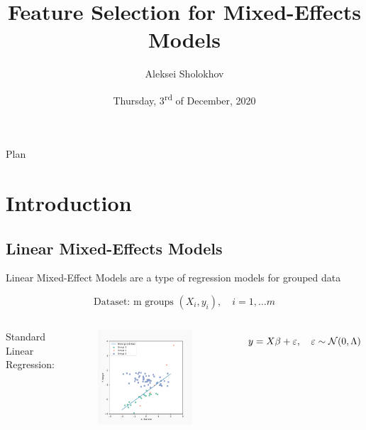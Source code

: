 \documentclass[8pt]{beamer}
\title{Feature Selection for Mixed-Effects Models}
\date{Thursday, 3\textsuperscript{rd} of December, 2020}
\author{Aleksei Sholokhov}
\begin{document}
\maketitle

\begin{frame}{Plan}
	\tableofcontents
\end{frame}

\section{Introduction}
\subsection{Linear Mixed-Effects Models}
\begin{frame}{Linear Mixed-Effect Models are a type of regression models for grouped data}

	\[
	\text{Dataset: m groups } (X_i, y_i),\quad i = 1, \dots m
    \]
	\begin{columns}[T,onlytextwidth]
	 \centering Standard Linear Regression:
   	\begin{figure}
   		\includegraphics[width=0.9\textwidth]{Figures/lme_example_mean_prediction}
   	\end{figure}
   	\[
   		y = X\beta + \varepsilon, \quad \varepsilon \sim \operatorname{\mathcal{N}}(0, \Lambda) 
   	\]


\end{columns}
\end{frame}
\end{document}
